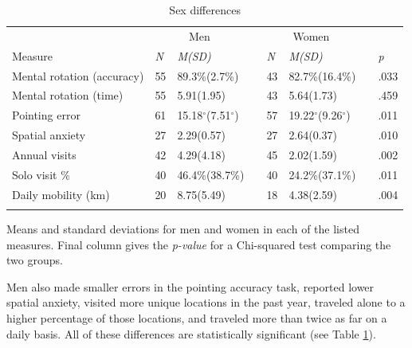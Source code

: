 \begin{table}[h!]
\caption{Sex differences}
\label{tab:sex}  
\begin{tabular}{llllllll}
\hline\noalign{\smallskip}
& \multicolumn{2}{c}{Men} && \multicolumn{2}{c}{Women} && \\
Measure & \emph{N} & \emph{M(SD)} && \emph{N} & \emph{M(SD)} && \emph{p} \\
\noalign{\smallskip}\hline\noalign{\smallskip}
Mental rotation (accuracy) & 55 & 89.3\%(2.7\%) && 43 & 82.7\%(16.4\%) && .033 \\
Mental rotation (time) & 55 & 5.91(1.95) && 43 & 5.64(1.73) && .459 \\
Pointing error & 61 & 15.18$^{\circ}$(7.51$^{\circ}$) && 57 & 19.22$^{\circ}$(9.26$^{\circ}$) && .011 \\
Spatial anxiety & 27 & 2.29(0.57) && 27 & 2.64(0.37) && .010 \\
Annual visits & 42 & 4.29(4.18) && 45 & 2.02(1.59) && .002 \\
Solo visit \% & 40 & 46.4\%(38.7\%) && 40 & 24.2\%(37.1\%) && .011 \\
Daily mobility (km) & 20 & 8.75(5.49) && 18 & 4.38(2.59) && .004 \\
\noalign{\smallskip}\hline
\end{tabular}\par
\bigskip
Means and standard deviations for men and women in each of the listed measures. Final column gives the \emph{p-value} for a Chi-squared test comparing the two groups. 
\end{table}		  

Men also made smaller errors in the pointing accuracy task, reported lower spatial anxiety, visited more unique locations in the past year, traveled alone to a higher percentage of those locations, and traveled more than twice as far on a daily basis.  All of these differences are statistically significant (see Table \ref{tab:sex}).

